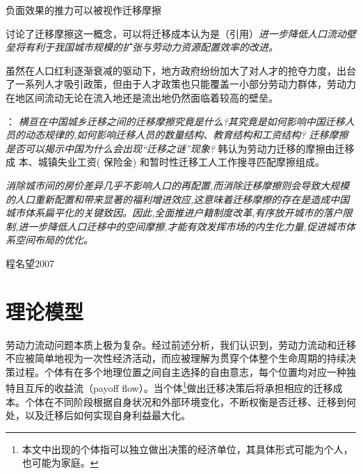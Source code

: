 \documentclass[a4paper,12pt,oneside]{book} %
\begin{document}
负面效果的推力可以被视作迁移摩擦

\cite{WangLiLiWoGuoRenKouQianYiChengBenChengShiGuiMoYuShengChanLu2020}讨论了迁移摩擦这一概念，可以将迁移成本认为是（引用）\textit{进一步降低人口流动壁垒将有利于我国城市规模的扩张与劳动力资源配置效率的改进。}

虽然在人口红利逐渐衰减的驱动下，地方政府纷纷加大了对人才的抢夺力度，出台了一系列人才吸引政策，但由于人才政策也只能覆盖一小部分劳动力群体，劳动力在地区间流动无论在流入地还是流出地仍然面临着较高的壁垒。

\cite{HanQiHengNongCunLaoDongLiQianYiMoCaYingXiangNongMinGongShuLiangYuGongZiJieGouMa2018}：
\textit{横亘在中国城乡迁移之间的迁移摩擦究竟是什么?其究竟是如何影响中国迁移人员的动态规律的,如何影响迁移人员的数量结构、教育结构和工资结构? 迁移摩擦是否可以揭示中国为什么会出现“迁移之谜”现象?}
韩认为劳动力迁移的摩擦由迁移成 本、城镇失业工资( 保险金) 和暂时性迁移工人工作搜寻匹配摩擦组成。

\cite{LiuXiuYanFangJieQianYiMoCaYuZhongGuoChengShiDeGuiMoFenBuLiLunMoXingYuJieGouShiGuJi2017}
\textit{消除城市间的房价差异几乎不影响人口的再配置,而消除迁移摩擦则会导致大规模的人口重新配置和带来显著的福利增进效应,这意味着迁移摩擦的存在是造成中国城市体系扁平化的关键致因。因此,全面推进户籍制度改革,有序放开城市的落户限制,进一步降低人口迁移中的空间摩擦,才能有效发挥市场的内生化力量,促进城市体系空间布局的优化。}


程名望2007






































\chapter{理论模型}

劳动力流动问题本质上极为复杂。经过前述分析，我们认识到，劳动力流动和迁移不应被简单地视为一次性经济活动，而应被理解为贯穿个体整个生命周期的持续决策过程。个体有在多个地理位置之间自主选择的自由意志，每个位置均对应一种独特且互斥的收益流（payoff flow）。当个体\footnote{本文中出现的个体指可以独立做出决策的经济单位，其具体形式可能为个人，也可能为家庭。}做出迁移决策后将承担相应的迁移成本。个体在不同阶段根据自身状况和外部环境变化，不断权衡是否迁移、迁移到何处，以及迁移后如何实现自身利益最大化。
\end{document}

